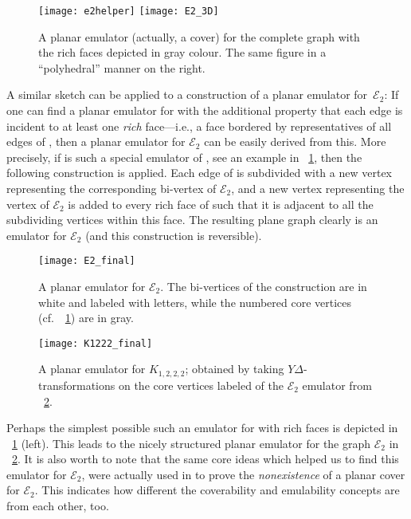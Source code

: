 \documentclass[envcountsect,envcountsame]{llncs}
\newcommand{\KKK}{\ensuremath{K_{1,2,2,2}}\xspace}
\newcommand{\EE}{\ensuremath{\mathcal{E}_2}\xspace}
\begin{document}
\begin{figure}[tb]\centering
\texttt{[image: e2helper]} \qquad\qquad
\texttt{[image: E2\_3D]}
\caption{A planar emulator (actually, a cover) for the complete graph 
	 with the rich faces depicted in gray colour. 
	The same figure in a ``polyhedral'' manner on the right.}
\label{fig:e2helper}
\end{figure}


A similar sketch can be applied to a construction of a planar emulator for~\EE:
If one can find a planar emulator for  with the additional property
that each edge is incident to at least one \emph{rich} face---i.e., a face
bordered by representatives of all edges of ,
then a planar emulator for \EE can be easily derived from this.
More precisely, if  is such a special emulator of ,
see an example in \figurename~\ref{fig:e2helper},
then the following construction is applied.
Each edge of  is subdivided with a new vertex representing the
corresponding bi-vertex of \EE,
and a new vertex representing the vertex  of \EE is added to every rich
face of  such that it is adjacent to all the 
subdividing vertices within this face.
The resulting plane graph  clearly is an emulator for \EE
(and this construction is reversible).

\begin{figure}[tb]\centering
\texttt{[image: E2\_final]}
\caption{A planar emulator for \EE.
	The bi-vertices of the construction are in white and labeled with
	letters, while the numbered core vertices 
	 (cf.~\figurename~\ref{fig:e2helper}) are in gray.}
\label{fig:e2_final}
\end{figure}

\begin{figure}[htbp]\centering
\texttt{[image: K1222\_final]}
\caption{A planar emulator for \KKK; 
	obtained by taking {\ensuremath{Y\!\Delta}}-transformations on
	the core vertices labeled  of the \EE emulator from
	\figurename~\ref{fig:e2_final}.}
\label{fig:K1222emul}\label{fig:k1222_final}
\end{figure}



Perhaps the simplest possible such an emulator for  with rich faces is
depicted in \figurename~\ref{fig:e2helper} (left).
This leads to the nicely structured planar emulator for the graph \EE in
\figurename~\ref{fig:e2_final}.
It is also worth to note that the same core ideas which helped us to find
this emulator for \EE, were actually used in \cite{cit:c4e2} to prove the
{\em nonexistence} of a planar cover for \EE.
This indicates how different the coverability and emulability concepts are
from each other, too.
\end{document}
